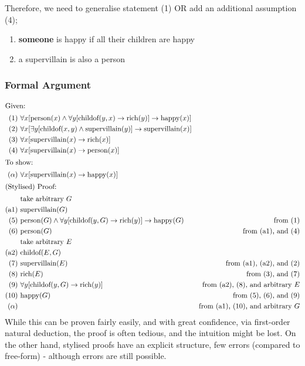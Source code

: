 \documentclass[a4paper, 12pt]{article}
\newcommand{\proofline}[3]{(#1)\ & #2 & \text{#3} \\}
\newcommand{\proofarbitrary}[1]{& \text{take arbitrary } #1 \\}
\begin{document}
                Therefore, we need to generalise statement (1) OR add an additional assumption (4);
                \begin{enumerate}[(1)]
                    \itemsep0em
                    \item \textbf{someone} is happy if all their children are happy
                    \setcounter{enumi}{3}
                    \item a supervillain is also a person
                \end{enumerate}
            \subsubsection*{Formal Argument}
                \begin{align*}
                    \intertext{Given:}
                    \proofline{1}{\forall x [\text{person}(x) \land \forall y [\text{childof}(y, x) \rightarrow \text{rich}(y)] \rightarrow \text{happy}(x)]}{}
                    \proofline{2}{\forall x [\exists y [\text{childof}(x, y) \land \text{supervillain}(y)] \rightarrow \text{supervillain}(x)]}{}
                    \proofline{3}{\forall x [\text{supervillain}(x) \rightarrow \text{rich}(x)]}{}
                    \proofline{4}{\forall x [\text{supervillain}(x) \rightarrow \text{person}(x)]}{}
                    \intertext{To show:}
                    \proofline{\alpha}{\forall x [\text{supervillain}(x) \rightarrow \text{happy}(x)]}{}
                    \intertext{(Stylised) Proof:}
                    \proofarbitrary{G}
                    \proofline{\text{a}1}{\text{supervillain}(G)}{}
                    \proofline{5}{\text{person}(G) \land \forall y [\text{childof}(y, G) \rightarrow \text{rich}(y)] \rightarrow \text{happy}(G)}{from (1)}
                    \proofline{6}{\text{person}(G)}{from (a1), and (4)}
                    \proofarbitrary{E}
                    \proofline{\text{a}2}{\text{childof}(E, G)}{}
                    \proofline{7}{\text{supervillain}(E)}{from (a1), (a2), and (2)}
                    \proofline{8}{\text{rich}(E)}{from (3), and (7)}
                    \proofline{9}{\forall y [\text{childof}(y, G) \rightarrow \text{rich}(y)]}{from (a2), (8), and arbitrary $E$}
                    \proofline{10}{\text{happy}(G)}{from (5), (6), and (9)}
                    \proofline{\alpha}{}{from (a1), (10), and arbitrary $G$}
                \end{align*}
                While this can be proven fairly easily, and with great confidence, via first-order natural deduction, the proof is often tedious, and the intuition might be lost. On the other hand, stylised proofs have an explicit structure, few errors (compared to free-form) - although errors are still possible.
                \medskip
\end{document}
